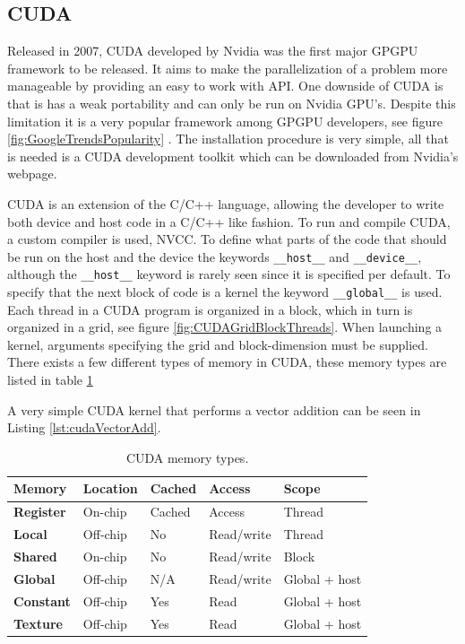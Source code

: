 \subsection{CUDA}
Released in 2007, CUDA developed by Nvidia was the first major GPGPU framework to be released. It aims to make the parallelization of a problem more manageable by providing an easy to work with API. One downside of CUDA is that is has a weak portability and can only be run on Nvidia GPU's. Despite this limitation it is a very popular framework among GPGPU developers, see figure \ref{fig:GoogleTrendsPopularity} \cite{AboutCuda}.  The installation procedure is very simple, all that is needed is a CUDA development toolkit which can be downloaded from Nvidia's webpage.

CUDA is an extension of the C/C++ language, allowing the developer to write both device and host code in a C/C++ like fashion. To run and compile CUDA, a custom compiler is used, NVCC. To define what parts of the code that should be run on the host and the device the keywords \lstinline{__host__} and \lstinline{__device__}, although the \lstinline{__host__} keyword is rarely seen since it is specified per default. To specify that the next block of code is a kernel the keyword \lstinline{__global__} is used.
Each thread in a CUDA program is organized in a block, which in turn is organized in a grid, see figure \ref{fig:CUDAGridBlockThreads}. When launching a kernel, arguments specifying the grid and block-dimension must be supplied. There exists a few different types of memory in CUDA, these memory types are listed in table \ref{tab:CUDAMemoryTypes} 

A very simple CUDA kernel that performs a vector addition can be seen in Listing \ref{lst:cudaVectorAdd}.

\begin{table}

    \begin{tabularx}{\textwidth}{ |X|X|X|X|X| }
      \hline
      \textbf{Memory} &  \textbf{Location} &  \textbf{Cached} &    \textbf{Access} &    \textbf{Scope} \\ \hline 
      \textbf{Register} & On-chip   & Cached    & Access        & Thread \\ \hline 
      \textbf{Local}    & Off-chip  & No        & Read/write    & Thread \\ \hline 
      \textbf{Shared}   & On-chip   & No        & Read/write    & Block \\ \hline 
      \textbf{Global}   & Off-chip  & N/A       & Read/write    & Global + host \\ \hline 
      \textbf{Constant} & Off-chip  & Yes       & Read          & Global + host \\ \hline 
      \textbf{Texture}  & Off-chip  & Yes       & Read          & Global + host \\ \hline 
    \end{tabularx}

\caption{\label{tab:CUDAMemoryTypes} CUDA memory types.}
\end{table}

